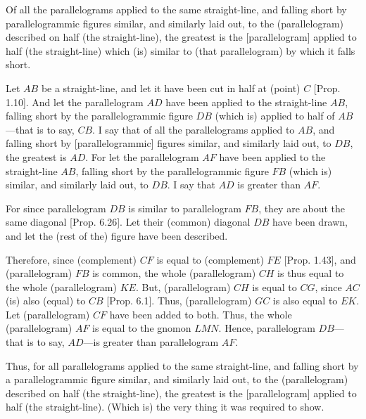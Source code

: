\begin{Parallel}{}{}
{Of all the parallelograms applied to the
same straight-line, and falling short by parallelogrammic figures
similar, and similarly laid out, to the (parallelogram)
described on half (the straight-line), the greatest is the [parallelogram]
applied to half (the straight-line) which (is) similar to (that parallelogram)
by which it falls short.

Let $AB$ be a straight-line, and let it have been cut in half at
(point) $C$ [Prop. 1.10]. And let the parallelogram $AD$ have been applied to the straight-line
$AB$, 
falling short by the parallelogrammic figure $DB$ (which is) applied to
half of $AB$---that is to say, $CB$. I say that of all  the parallelograms applied to $AB$, and
falling short by  [parallelogrammic] figures similar, and similarly
laid out, to $DB$, the greatest is $AD$. For let the parallelogram
$AF$ have been applied to the straight-line $AB$, falling short by
the parallelogrammic figure $FB$ (which is) similar, and similarly laid out,
to $DB$. I say that $AD$ is greater than $AF$.

\epsfysize=2in
\centerline{}

For since parallelogram $DB$ is similar to parallelogram $FB$, they are
about the same diagonal [Prop. 6.26].
Let their (common) diagonal $DB$ have been drawn, and let the (rest of the)  figure have been
described.

Therefore, since (complement) $CF$ is equal to (complement) $FE$  [Prop. 1.43],
and (parallelogram) $FB$ is common, the whole (parallelogram) $CH$ is thus
equal to the whole (parallelogram) $KE$. But, (parallelogram)
$CH$ is equal to $CG$, since $AC$ (is) also (equal) to $CB$ [Prop. 6.1]. Thus, (parallelogram) $GC$ is also equal to $EK$. 
Let (parallelogram) $CF$ have been added to both. Thus, the whole (parallelogram) $AF$
is equal to the gnomon $LMN$. Hence, parallelogram $DB$---that is
to say, $AD$---is greater than parallelogram $AF$.

Thus, for all parallelograms applied to the
same straight-line, and falling short by a parallelogrammic figure
similar, and similarly laid out, to the (parallelogram)
described on half (the straight-line), the greatest is the [parallelogram]
applied to half (the straight-line). (Which is) the very thing it was required
to show.}
\end{Parallel}

